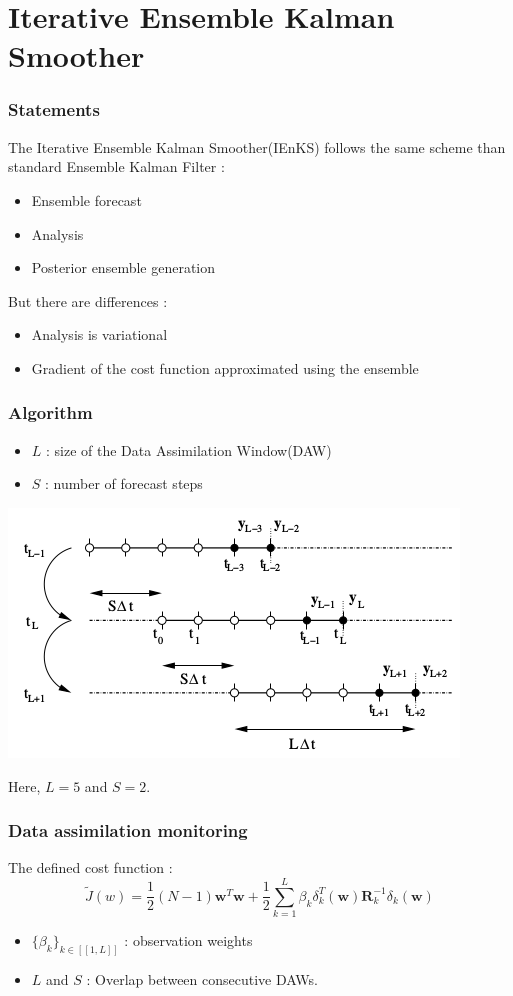 \documentclass{beamer}
\begin{document}
\section{Iterative Ensemble Kalman Smoother}
\begin{frame}
\frametitle{Statements}
The Iterative Ensemble Kalman Smoother(IEnKS) follows the same scheme than standard Ensemble Kalman Filter :
\begin{itemize}
\item Ensemble forecast
\item Analysis
\item Posterior ensemble generation
\end{itemize}

But there are differences :
\begin{itemize}
\item  Analysis is variational
\item  Gradient of the cost function approximated using the ensemble
\end{itemize}
\end{frame}

\begin{frame}
\frametitle{Algorithm}
\begin{itemize}
\item $L$ : size of the Data Assimilation Window(DAW)
\item $S$ : number of forecast steps
\end{itemize}
\begin{center}
\includegraphics[scale=0.5]{../Image/IEnKS_chaining.png} 
\end{center}
Here, $L=5$ and $S=2$.
\end{frame}


\begin{frame}
\frametitle{Data assimilation monitoring}
The defined cost function :
$$\tilde{J}(w) = \frac{1}{2}(N-1)\textbf{w}^{T}\textbf{w} + \frac{1}{2}\sum_{k=1}^{L}\beta_{k}\delta_{k}^{T}(\textbf{w})\textbf{R}_{k}^{-1}\delta_{k}(\textbf{w})$$

\begin{itemize}
\item $\{\beta_k\}_{k \in [\![1,L]\!]}$ : observation weights
\item $L$ and $S$ : Overlap between consecutive DAWs.
\end{itemize}
\end{frame}
\end{document}
